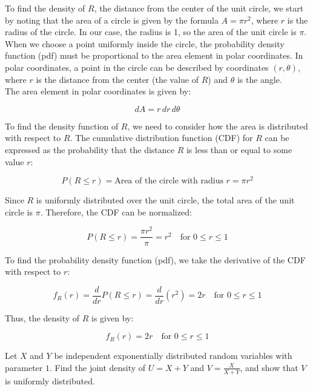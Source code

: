 \begin{solution}
To find the density of \( R \), the distance from the center of the unit circle, we start by noting that the area of a circle is given by the formula \( A = \pi r^2 \), where \( r \) is the radius of the circle. In our case, the radius is 1, so the area of the unit circle is \( \pi \).\\

When we choose a point uniformly inside the circle, the probability density function (pdf) must be proportional to the area element in polar coordinates. In polar coordinates, a point in the circle can be described by coordinates \( (r, \theta) \), where \( r \) is the distance from the center (the value of \( R \)) and \( \theta \) is the angle.\\

The area element in polar coordinates is given by:

\[
dA = r \, dr \, d\theta
\]

To find the density function of \( R \), we need to consider how the area is distributed with respect to \( R \). The cumulative distribution function (CDF) for \( R \) can be expressed as the probability that the distance \( R \) is less than or equal to some value \( r \):

\[
P(R \leq r) = \text{Area of the circle with radius } r = \pi r^2
\]

Since \( R \) is uniformly distributed over the unit circle, the total area of the unit circle is \( \pi \). Therefore, the CDF can be normalized:

\[
P(R \leq r) = \frac{\pi r^2}{\pi} = r^2 \quad \text{for } 0 \leq r \leq 1
\]

To find the probability density function (pdf), we take the derivative of the CDF with respect to \( r \):

\[
f_R(r) = \frac{d}{dr} P(R \leq r) = \frac{d}{dr} (r^2) = 2r \quad \text{for } 0 \leq r \leq 1
\]

Thus, the density of \( R \) is given by:

\[
f_R(r) = 2r \quad \text{for } 0 \leq r \leq 1
\]
\end{solution}


\begin{exercise}
Let \( X \) and \( Y \) be independent exponentially distributed random variables with parameter \( 1 \). Find the joint density of \( U = X + Y \) and \( V = \frac{X}{X+Y} \), and show that \( V \) is uniformly distributed.
\end{exercise}

